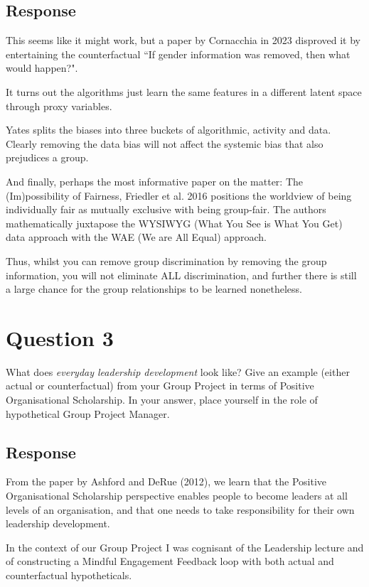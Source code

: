 \documentclass{scrartcl}
\begin{document}
\subsection{Response}

This seems like it might work, but a paper by Cornacchia in 2023 disproved it by entertaining the counterfactual ``If gender information was removed, then what would happen?".

It turns out the algorithms just learn the same features in a different latent space through proxy variables.

Yates splits the biases into three buckets of algorithmic, activity and data. Clearly removing the data bias will not affect the systemic bias that also prejudices a group.

And finally, perhaps the most informative paper on the matter: The (Im)possibility of Fairness, Friedler et al. 2016 positions the worldview of being individually fair as mutually exclusive with being group-fair. The authors mathematically juxtapose the WYSIWYG (What You See is What You Get) data approach with the WAE (We are All Equal) approach.

Thus, whilst you can remove group discrimination by removing the group information, you will not eliminate ALL discrimination, and further there is still a large chance for the group relationships to be learned nonetheless.


\newpage
\section{Question 3}
\begin{tcolorbox}[colback=white,colframe=purple, sharp corners]
What does \emph{everyday leadership development} look like? Give an example (either actual or counterfactual) from your Group Project in terms of Positive Organisational Scholarship. In your answer, place yourself in the role of hypothetical Group Project Manager.
\end{tcolorbox}

\subsection{Response}
From the paper by Ashford and DeRue (2012), we learn that the Positive Organisational Scholarship perspective enables people to become leaders at all levels of an organisation, and that one needs to take responsibility for their own leadership development.

In the context of our Group Project I was cognisant of the Leadership lecture and of constructing a Mindful Engagement Feedback loop with both actual and counterfactual hypotheticals.
\end{document}
